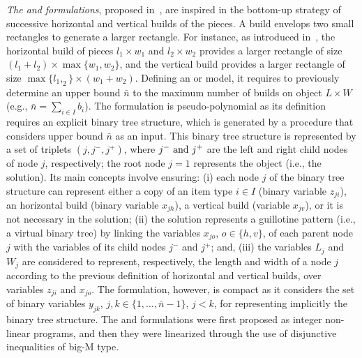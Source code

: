 \emph{The {\modelHierarchical} and {\modelImplicit} formulations}, proposed in~\citet{martin:2020:bottom}, are inspired in the bottom-up strategy of successive horizontal and vertical builds of the pieces.
A build envelops two small rectangles to generate a larger rectangle.
For instance, as introduced in~\citet{wang:1983}, the horizontal build of pieces \(l_1 \times w_1\) and \(l_2 \times w_2\) provides a larger rectangle of size \((l_1+l_2)\times \max\{w_1, w_2\}\), and the vertical build provides a larger rectangle of size \(\max\{l_1, _2\} \times (w_1+w_2)\).
Defining an {\modelHierarchical} or {\modelImplicit} model, it requires to previously determine an upper bound \(\bar{n}\) to the maximum number of builds on object \(L \times W\) (e.g., \(\bar{n}=\sum_{i \in I} b_i\)).
The {\modelHierarchical} formulation is pseudo-polynomial as its definition requires an explicit binary tree structure, which is generated by a procedure that considers upper bound \(\bar{n}\) as an input.
This binary tree structure is represented by a set of triplets \((j,j^-,j^+)\), where \(j^-$ and $j^+\) are the left and right child nodes of node \(j\), respectively; the root node \(j=1\) represents the object (i.e., the solution).
Its main concepts involve ensuring:
(i) each node \(j\) of the binary tree structure can represent either a copy of an item type \(i \in I\) (binary variable \(z_{ji}\)), an horizontal build (binary variable \(x_{jh}\)), a vertical build (variable \(x_{jv}\)), or it is not necessary in the solution;
(ii) the solution represents a guillotine pattern (i.e., a virtual binary tree) by linking the variables \(x_{jo}\), \(o \in \{h,v\}\), of each parent node \(j\) with the variables of its child nodes \(j^-\) and \(j^+\); and,
(iii) the variables \(L_j\) and \(W_j\) are considered to represent, respectively, the length and width of a node \(j\) according to the previous definition of horizontal and vertical builds, over variables \(z_{ji}\) and \(x_{jo}\).
The {\modelImplicit} formulation, however, is compact as it considers the set of binary variables \(y_{jk}\), \(j,k \in \{1,\ldots,\bar{n}-1\}\), \(j<k\), for representing implicitly the binary tree structure.
The {\modelHierarchical} and {\modelImplicit} formulations were first proposed as integer non-linear programs, and then they were linearized through the use of disjunctive inequalities of big-M type.

